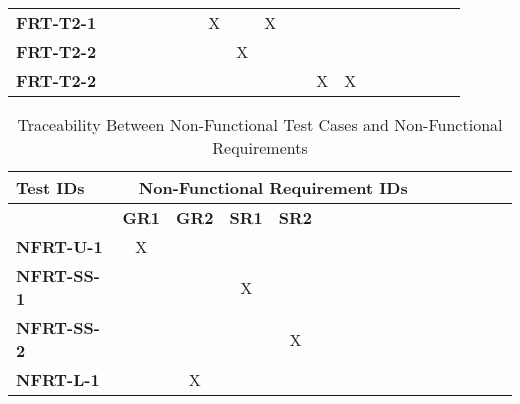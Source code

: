 \documentclass[12pt, titlepage]{article}
\begin{document}
\begin{landscape}
\begin{longtable}{|l|cccccccccccccccc|}
            \textbf{FRT-T2-1}  & ~                                                         & ~            & ~            & ~            & X            & ~            & X            & ~            & ~            & ~             \\
            \textbf{FRT-T2-2}  & ~                                                         & ~            & ~            & ~            & ~            & X            & ~            & ~            & ~            & ~             \\
            \textbf{FRT-T2-2}  & ~                                                         & ~            & ~            & ~            & ~            & ~            & ~            & ~            & X            & X             \\     
			\hline
		\end{longtable}

		\begin{longtable}{|l|cccccccccccccccc|}
			\caption{Traceability Between Non-Functional Test Cases and Non-Functional Requirements}                                                                                                                                                                                                                           \\
			\hline
			\textbf{Test IDs}   & \multicolumn{11}{c|}{\textbf{Non-Functional Requirement IDs}}                                                                                                                                                                                                                                         \\
			\hline
			~                   & \textbf{GR1}                                              & \textbf{GR2} & \textbf{SR1} & \textbf{SR2} \\
			\hline
			\textbf{NFRT-U-1}  & X                                                         & ~            & ~            & ~             \\
			\textbf{NFRT-SS-1}  & ~                                                         & ~            & X            & ~            \\
			\textbf{NFRT-SS-2}  & ~                                                         & ~            & ~            & X            \\
			\textbf{NFRT-L-1}  & ~                                                         & X            & ~            & ~             \\
			\hline
		\end{longtable}
\end{landscape}
\end{document}
